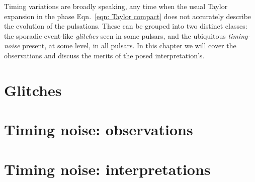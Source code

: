\documentclass[../full_thesis/full_thesis.tex]{subfiles}
\newcommand{\thisdir}{../timing_variations}
\begin{document}
Timing variations are broadly speaking, any time when the usual Taylor
expansion in the phase Eqn.~\eqref{eqn: Taylor compact} does not accurately
describe the evolution of the pulsations. These can be grouped into two
distinct classes: the sporadic event-like \emph{glitches} seen in some pulsars,
and the ubiquitous \emph{timing-noise} present, at some level, in all pulsars.
In this chapter we will cover the observations and discuss the merits of the
posed interpretation's.

\section{Glitches}
\label{sec: glitches}


\section{Timing noise: observations}
\label{sec: timing noise observations}


\section{Timing noise: interpretations}
\label{sec: timing noise interpretations}


\biblio
\end{document}
